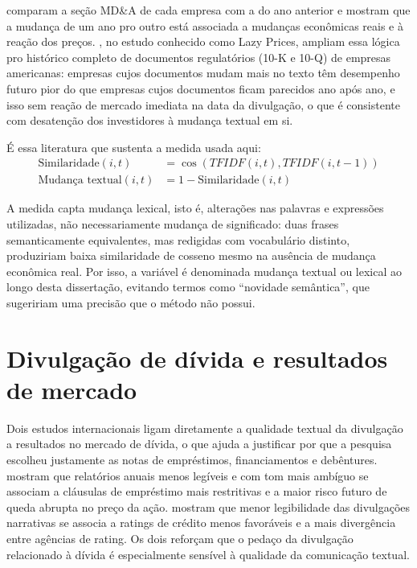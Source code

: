 \documentclass[a4paper,12pt]{report}
\begin{document}
 comparam a seção MD\&A de cada empresa com a do ano anterior e mostram que a mudança de um ano pro outro está associada a mudanças econômicas reais e à reação dos preços. , no estudo conhecido como Lazy Prices, ampliam essa lógica pro histórico completo de documentos regulatórios (10-K e 10-Q) de empresas americanas: empresas cujos documentos mudam mais no texto têm desempenho futuro pior do que empresas cujos documentos ficam parecidos ano após ano, e isso sem reação de mercado imediata na data da divulgação, o que é consistente com desatenção dos investidores à mudança textual em si.

É essa literatura que sustenta a medida usada aqui:
\begin{align}
    \text{Similaridade}(i,t) &= \cos\left(\mathit{TFIDF}(i,t), \mathit{TFIDF}(i,t-1)\right) \\
    \text{Mudança textual}(i,t) &= 1 - \text{Similaridade}(i,t)
\end{align}

A medida capta mudança lexical, isto é, alterações nas palavras e expressões utilizadas, não necessariamente mudança de significado: duas frases semanticamente equivalentes, mas redigidas com vocabulário distinto, produziriam baixa similaridade de cosseno mesmo na ausência de mudança econômica real. Por isso, a variável é denominada mudança textual ou lexical ao longo desta dissertação, evitando termos como ``novidade semântica'', que sugeririam uma precisão que o método não possui.

\section{Divulgação de dívida e resultados de mercado}

Dois estudos internacionais ligam diretamente a qualidade textual da divulgação a resultados no mercado de dívida, o que ajuda a justificar por que a pesquisa escolheu justamente as notas de empréstimos, financiamentos e debêntures.  mostram que relatórios anuais menos legíveis e com tom mais ambíguo se associam a cláusulas de empréstimo mais restritivas e a maior risco futuro de queda abrupta no preço da ação.  mostram que menor legibilidade das divulgações narrativas se associa a ratings de crédito menos favoráveis e a mais divergência entre agências de rating. Os dois reforçam que o pedaço da divulgação relacionado à dívida é especialmente sensível à qualidade da comunicação textual.
\end{document}
